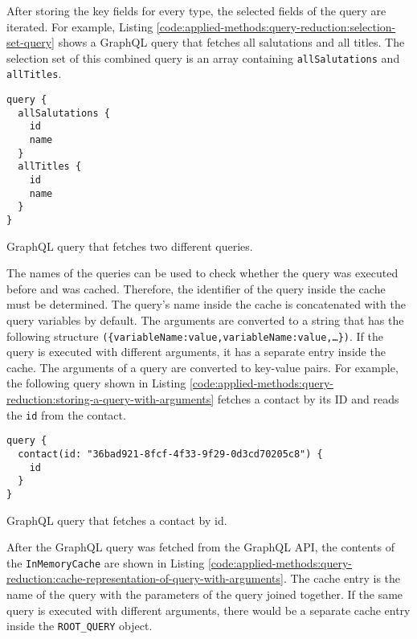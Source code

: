 After storing the key fields for every type, the selected fields of the query are iterated. For example, Listing \ref{code:applied-methods:query-reduction:selection-set-query} shows a GraphQL query that fetches all salutations and all titles. The selection set of this combined query is an array containing \texttt{allSalutations} and \texttt{allTitles}.

\ifshowListings
\begin{listing}[H]
  \begin{verbatim}
query {
  allSalutations {
    id
    name
  }
  allTitles {
    id
    name
  }
}
  \end{verbatim}
  \caption{GraphQL query that fetches two different queries.}\label{code:applied-methods:query-reduction:selection-set-query}
\end{listing}
\fi

\noindent The names of the queries can be used to check whether the query was executed before and was cached. Therefore, the identifier of the query inside the cache must be determined. The query's name inside the cache is concatenated with the query variables by default. The arguments are converted to a string that has the following structure \texttt{(\{variableName:value,variableName:value,\dots\})}. If the query is executed with different arguments, it has a separate entry inside the cache. The arguments of a query are converted to key-value pairs. For example, the following query shown in Listing \ref{code:applied-methods:query-reduction:storing-a-query-with-arguments} fetches a contact by its \ac{ID} and reads the \texttt{id} from the contact.

\ifshowListings
\begin{listing}[H]
\begin{verbatim}
query {
  contact(id: "36bad921-8fcf-4f33-9f29-0d3cd70205c8") {
    id
  }
}
\end{verbatim}
\caption{GraphQL query that fetches a contact by id.}\label{code:applied-methods:query-reduction:storing-a-query-with-arguments}
\end{listing}
\fi

\noindent After the GraphQL query was fetched from the GraphQL \ac{API}, the contents of the \texttt{InMemoryCache} are shown in Listing \ref{code:applied-methods:query-reduction:cache-representation-of-query-with-arguments}. The cache entry is the name of the query with the parameters of the query joined together. If the same query is executed with different arguments, there would be a separate cache entry inside the \texttt{ROOT\_QUERY} object.

